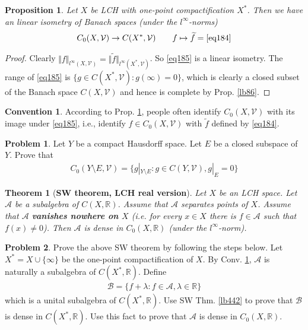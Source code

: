\documentclass[12pt,b5paper,notitlepage]{article}
\theoremstyle{definition}
\newtheorem{cv}[df]{Convention}
\newtheorem{prob}{\color{red}Problem}[section]
\theoremstyle{plain}
\newtheorem{thm}[df]{Theorem}
\newtheorem{pp}[df]{Proposition}
\newcommand{\mc}{\mathcal}
\newcommand{\wtd}{\widetilde}
\newcommand{\scr}{\mathscr}
\newcommand{\Rbb}{\mathbb R}
\numberwithin{equation}{section}
\begin{document}
\begin{pp}\label{lb432}
Let $X$ be LCH with one-point compactification $X^*$. Then we have an linear isometry of Banach spaces (under the $l^\infty$-norms)
\begin{align}\label{eq185}
C_0(X,\mc V)\rightarrow C(X^*,\mc V)\qquad f\mapsto \wtd f=\eqref{eq184}
\end{align}
\end{pp}

\begin{proof}
Clearly $\Vert f\Vert_{l^\infty(X,\mc V)}=\Vert \wtd f\Vert_{l^\infty(X^*,\mc V)}$. So \eqref{eq185} is a linear isometry. The range of \eqref{eq185} is $\{g\in C(X^*,\mc V):g(\infty)=0\}$, which is clearly a closed subset of the Banach space $C(X,\mc V)$ and hence is complete by Prop. \ref{lb86}.
\end{proof}


\begin{cv}\label{lb449}
According to Prop. \ref{lb432}, people often identify $C_0(X,\mc V)$ with its image under \eqref{eq185}, i.e., identify $f\in C_0(X,\mc V)$ with $\wtd f$ defined by \eqref{eq184}.
\end{cv}








\begin{prob}
Let $Y$ be a compact Hausdorff space. Let $E$ be a closed subspace of $Y$. Prove that 
\begin{align*}
C_0(Y\setminus E,\mc V)=\{g|_{Y\setminus E}:g\in C(Y,\mc V),g|_E=0\}
\end{align*}
\end{prob}



\begin{thm}[\textbf{SW theorem, LCH real version}]
Let $X$ be an LCH space. Let $\scr A$ be a subalgebra of $C(X,\Rbb)$. Assume that $\scr A$ separates points of $X$. Assume that $\scr A$ \textbf{vanishes nowhere on $X$}  (i.e. for every $x\in X$ there is $f\in\scr A$ such that $f(x)\neq0$). Then $\scr A$ is dense in $C_0(X,\Rbb)$ (under the $l^\infty$-norm).
\end{thm}

\begin{prob}
Prove the above SW theorem by following the steps below. Let $X^*=X\cup\{\infty\}$ be the one-point compactification of $X$. By Conv. \ref{lb449}, $\scr A$ is naturally a subalgebra of $C(X^*,\Rbb)$. Define
\begin{align*}
\scr B=\{f+\lambda:f\in\scr A,\lambda\in\Rbb\}
\end{align*}
which is a unital subalgebra of $C(X^*,\Rbb)$. Use SW Thm. \ref{lb442} to prove that $\scr B$ is dense in $C(X^*,\Rbb)$. Use this fact to prove that $\scr A$ is dense in $C_0(X,\Rbb)$.
\end{prob}
\end{document}
